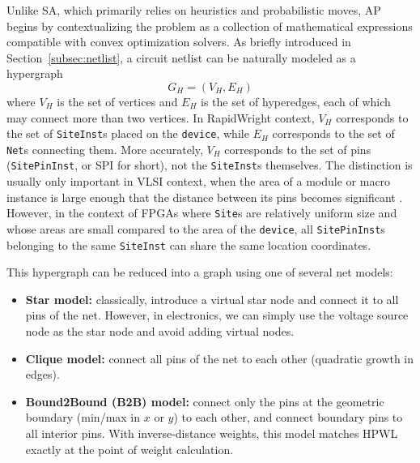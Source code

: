 Unlike SA, which primarily relies on heuristics and probabilistic moves, AP begins by contextualizing the problem as a collection of mathematical expressions compatible with convex optimization solvers.
As briefly introduced in Section~\ref{subsec:netlist}, a circuit netlist can be naturally modeled as a hypergraph
\begin{equation}
    G_{H} = (V_{H}, E_{H})
    \label{equ:hypergraph}
\end{equation}
where \(V_{H}\) is the set of vertices and \(E_{H}\) is the set of hyperedges, each of which may connect more than two vertices. 
In RapidWright context, \(V_{H}\) corresponds to the set of \texttt{SiteInst}s placed on the \texttt{device}, while \(E_{H}\) corresponds to the set of \texttt{Net}s connecting them.
More accurately, $V_H$ corresponds to the set of pins (\texttt{SitePinInst}, or SPI for short), not the \texttt{SiteInst}s themselves.
The distinction is usually only important in VLSI context, when the area of a module or macro instance is large enough that the distance between its pins becomes significant \cite{kraftwerk2}.
However, in the context of FPGAs where \texttt{Site}s are relatively uniform size and whose areas are small compared to the area of the \texttt{device}, all \texttt{SitePinInst}s belonging to the same \texttt{SiteInst} can share the same location coordinates.


This hypergraph can be reduced into a graph using one of several net models:
\begin{itemize}
    \item \textbf{Star model:} classically, introduce a virtual star node and connect it to all pins of the net. However, in electronics, we can simply use the voltage source node as the star node and avoid adding virtual nodes.
    \item \textbf{Clique model:} connect all pins of the net to each other (quadratic growth in edges). 
    \item \textbf{Bound2Bound (B2B) model:} connect only the pins at the geometric boundary (min/max in $x$ or $y$) to each other, and connect boundary pins to all interior pins. With inverse-distance weights, this model matches HPWL exactly at the point of weight calculation.
\end{itemize}


